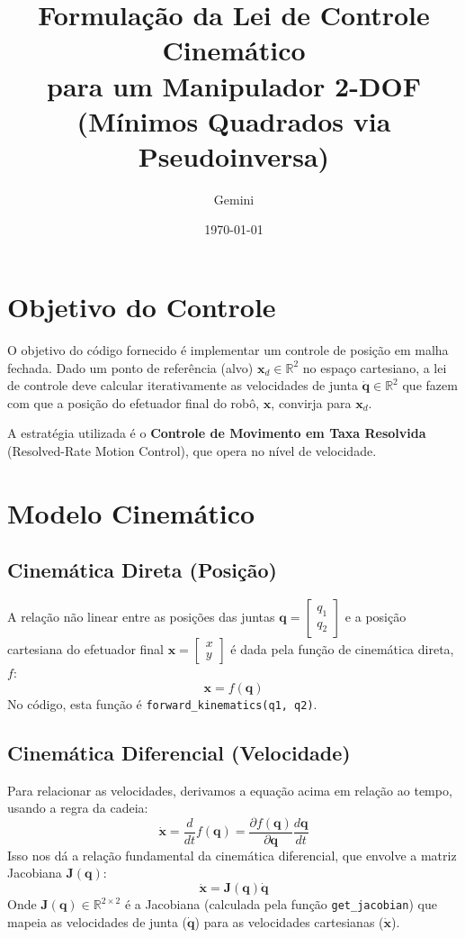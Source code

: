 \documentclass[a4paper, 12pt]{article}
\title{Formulação da Lei de Controle Cinemático \\
       para um Manipulador 2-DOF \\
       \large (Mínimos Quadrados via Pseudoinversa)}
\author{Gemini}
\date{\today}
\begin{document}
\maketitle

\section{Objetivo do Controle}
O objetivo do código fornecido é implementar um controle de posição em malha fechada. Dado um ponto de referência (alvo) $\mathbf{x}_d \in \mathbb{R}^2$ no espaço cartesiano, a lei de controle deve calcular iterativamente as velocidades de junta $\dot{\mathbf{q}} \in \mathbb{R}^2$ que fazem com que a posição do efetuador final do robô, $\mathbf{x}$, convirja para $\mathbf{x}_d$.

A estratégia utilizada é o \textbf{Controle de Movimento em Taxa Resolvida} (Resolved-Rate Motion Control), que opera no nível de velocidade.

\section{Modelo Cinemático}

\subsection{Cinemática Direta (Posição)}
A relação não linear entre as posições das juntas $\mathbf{q} = \begin{bmatrix} q_1 \\ q_2 \end{bmatrix}$ e a posição cartesiana do efetuador final $\mathbf{x} = \begin{bmatrix} x \\ y \end{bmatrix}$ é dada pela função de cinemática direta, $f$:
\[
\mathbf{x} = f(\mathbf{q})
\]
No código, esta função é \texttt{forward\_kinematics(q1, q2)}.

\subsection{Cinemática Diferencial (Velocidade)}
Para relacionar as velocidades, derivamos a equação acima em relação ao tempo, usando a regra da cadeia:
\[
\dot{\mathbf{x}} = \frac{d}{dt} f(\mathbf{q}) = \frac{\partial f(\mathbf{q})}{\partial \mathbf{q}} \frac{d\mathbf{q}}{dt}
\]
Isso nos dá a relação fundamental da cinemática diferencial, que envolve a matriz Jacobiana $\mathbf{J}(\mathbf{q})$:
\begin{equation}
\dot{\mathbf{x}} = \mathbf{J}(\mathbf{q}) \dot{\mathbf{q}}
\label{eq:jacobiana}
\end{equation}
Onde $\mathbf{J}(\mathbf{q}) \in \mathbb{R}^{2 \times 2}$ é a Jacobiana (calculada pela função \texttt{get\_jacobian}) que mapeia as velocidades de junta ($\dot{\mathbf{q}}$) para as velocidades cartesianas ($\dot{\mathbf{x}}$).
\end{document}
